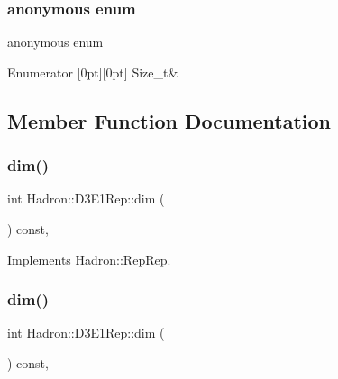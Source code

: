 \subsubsection{\texorpdfstring{anonymous enum}{anonymous enum}}
{\footnotesize\ttfamily anonymous enum}

\begin{DoxyEnumFields}{Enumerator}
[0pt][0pt]{}\mbox{\label{structHadron_1_1D3E1Rep_ab5bbd179a24450454aae261b94251aa7a85f1e1ab47e0ae866d8df43d2fac9d45}} 
Size\+\_\+t&\\
\hline

\end{DoxyEnumFields}


\subsection{Member Function Documentation}
\mbox{\label{structHadron_1_1D3E1Rep_af48681bf92a948c02889dcaa4a44812b}} 
\subsubsection{\texorpdfstring{dim()}{dim()}\hspace{0.1cm}{\footnotesize\ttfamily [1/5]}}
{\footnotesize\ttfamily int Hadron\+::\+D3\+E1\+Rep\+::dim (\begin{DoxyParamCaption}{ }\end{DoxyParamCaption}) const\hspace{0.3cm}{\ttfamily [inline]}, {\ttfamily [virtual]}}



Implements \mbox{\hyperlink{structHadron_1_1RepRep_a92c8802e5ed7afd7da43ccfd5b7cd92b}{Hadron\+::\+Rep\+Rep}}.

\mbox{\label{structHadron_1_1D3E1Rep_af48681bf92a948c02889dcaa4a44812b}} 
\subsubsection{\texorpdfstring{dim()}{dim()}\hspace{0.1cm}{\footnotesize\ttfamily [2/5]}}
{\footnotesize\ttfamily int Hadron\+::\+D3\+E1\+Rep\+::dim (\begin{DoxyParamCaption}{ }\end{DoxyParamCaption}) const\hspace{0.3cm}{\ttfamily [inline]}, {\ttfamily [virtual]}}



